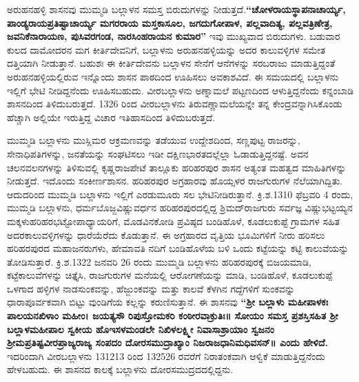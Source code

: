ಅರುಹನಹಳ್ಳಿ ಶಾಸನವು ಮುಮ್ಮಡಿ ಬಲ್ಲಾಳನ ಸಮಸ್ತ ಬಿರುದುಗಳನ್ನು ನೀಡುತ್ತದೆ.\textbf{“ಚೋಳರಾಯಸ್ಥಾಪನಾ\-ಚಾರ್ಯ್ಯ, ಪಾಂಡ್ಯರಾಯಪ್ರತಿಷ್ಟಾಚಾರ್ಯ್ಯ ಮಗರರಾಯ ಮಸ್ತಕಾಸೂಲ, ಜಗದುಗೋಪಾಳ, ಪಲ್ಲವಾದಿತ್ಯ, ಪಲ್ಲವತ್ರಿಣೇತ್ರ,\general{\break } ಜವನಿಕೆನಾರಾಯಣ, ಪುಸಿವರಗಂಡ, ನಾರಸಿಂಹರಾಯನ ಕುಮಾರ”} ಇವು ಮುಖ್ಯವಾದ ಬಿರುದುಗಳು. ಬಡುವಾರ ಕುಲದ ದಾಮೋದರನ ಮಗ ಕೀರ್ತಿದೇವನಿಗೆ, ಬಲ್ಲಾಳನು ಅರುಹನಹಳ್ಳಿಯನ್ನು ಅದರ ಕಾಲುವಳ್ಳಿಗಳ ಸಮೇತ ದತ್ತಿಯಾಗಿ ನೀಡುತ್ತಾನೆ. ಬಹುಶಃ ಈ ಕೀರ್ತಿದೇವನು ಬಲ್ಲಾಳನ ಸೇನೆಗೆ ಆನೆಗಳನ್ನು ಸರಬರಾಜು ಮಾಡುತ್ತಿದ್ದಂತೆ ಅರುಹನಹಳ್ಳಿಯಲ್ಲಿರುವ ಇನ್ನೊಂದು ಶಾಸನ ಪಾಠದಿಂದ ಊಹಿಸಲು ಅವಕಾಶವಿದೆ. ಈ ಸಮಯದಲ್ಲಿ ಬಲ್ಲಾಳನು ಇಲ್ಲಿಗೆ ಭೇಟಿ ನೀಡಿದ್ದನೆಂದು ಊಹಿಸಬಹುದು. ವೀರಬಲ್ಲಾಳನು ಅಣ್ನಾಮಲೆ ಪಟ್ಟಣದಿಂದ ಆಳುತ್ತಿದ್ದನೆಂದು ಕನ್ನಂಬಾಡಿ ಶಾಸನದಿಂದ ತಿಳಿದುಬರುತ್ತದೆ. 1326 ರಿಂದ ವೀರಬಲ್ಲಾಳನು ತಿರುವಣ್ಣಾಮಲೆಯನ್ನೇ ತನ್ನ ಕೇಂದ್ರವನ್ನಾಗಿಸಿಕೊಂಡು ಹೆಚ್ಚಾಗಿ ಅಲ್ಲಿಯೇ ಇರುತ್ತಿದ್ದ ವಿಚಾರ ಇತಿಹಾಸದಿಂದ ತಿಳಿದುಬರುತ್ತದೆ.

ಮುಮ್ಮಡಿ ಬಲ್ಲಾಳನು ಮುಸ್ಲಿಮರ ಆಕ್ರಮಣವನ್ನು ತಡೆಯುವ ಉದ್ದೇಶದಿಂದ, ಸಣ್ಣಪುಟ್ಟ ರಾಜರನ್ನು, ಸೇನಾಧಿಪತಿ\-ಗಳನ್ನು, ಜನತೆಯನ್ನು ಸಂಘಟಿಸಲು ಇಡೀ ದಕ್ಷಿಣಭಾರತದಲ್ಲೆಲ್ಲಾ ಓಡಾಡುತ್ತಿದ್ದನಷ್ಟೆ. ಅವನ ಚಲನವಲನಗಳನ್ನು ತಿಳಿಸುವಲ್ಲಿ ಕೃಷ್ಣರಾಜಪೇಟೆ ತಾಲ್ಲೂಕು ಹರಿಹರಪುರ ಶಾಸನ ಅತ್ಯಂತ ಮಹತ್ವದ ಮಾಹಿತಿಗಳನ್ನು ನೀಡುತ್ತದೆ. ಇದೊಂದು ಸಂಕೀರ್ಣ\-ಶಾಸನ. ಹರಿಹರಪುರ ಅಗ್ರಹಾರವು ಹೊಯ್ಸಳರ ರಾಜಗುರುಗಳ ನೆಲೆಯಾಗಿದ್ದಿತು. ಆದುದರಿಂದ ಮುಮ್ಮಡಿ ಬಲ್ಲಾಳನು ಇಲ್ಲಿಗೆ ಎರಡುಮೂರು ಸಲ ಭೇಟಿನೀಡಿರುತ್ತಾನೆ. ಕ್ರಿ.ಶ.1310 ಫೆಬ್ರವರಿ 4 ರಂದು, ಮುಮ್ಮಡಿ ಬಲ್ಲಾಳನು, ಧರ್ಮಬೊಜ್ಜವಿಷ್ಣುವರ್ಧನ ಹರಿಹರಪುರದಲ್ಲಿದ್ದ ಶ್ರಿಮದ್​ರಾಜಗುರು ಸರ್ವಜ್ಞ ವಿಷ್ಣುಭಟ್ಟಯ್ಯನ ಮಕ್ಕಳು\break ಹರಿಹರಭಟ್ಟೋಪಾಧ್ಯಾಯರಿಗೆ, ಮೊಡವಿನಕೋಡಿ ಪ್ರವಿಷ್ಠದ ಬಂಡಿಹೊಳೆ, ಕೂಡಲುಕುಪ್ಟೆ ಗ್ರಾಮಗಳ ಸಹಿತ ಅದರ\break ಕಾಲುವಳ್ಳಿಗಳನ್ನು ಧಾರೆಯೆರೆದು ಕೊಡುತ್ತಾನೆ. ಈ ಅಗ್ರಹಾರದ ವೃತ್ತಿಯ ಭೂಮಿಗಳಿಗೆ ನೀರು ಹರಿಸಲು ಹರಿಹರಪುರದ ಮಹಾಜನರುಗಳು, ಹೇಮಾವತಿ ನದಿಗೆ ಬಂಡಿಹೊಳೆಯ ಬಳಿ ಒಂದು ಕಟ್ಟೆಯನ್ನು ಕಟ್ಟಿ ಕಾಲುವೆಯನ್ನು ತೋಡಿಸುತ್ತಾರೆ. ಕ್ರಿ.ಶ.1322 ಜನವರಿ 26 ರಂದು ಮುಮ್ಮಡಿ ಬಲ್ಲಾಳನು ಹರಿಹರಪುರಕ್ಕೆ ಬಿಜಯಮಾಡಿ, ಕಟ್ಟೆಕಾಲುವೆಗಳನ್ನು ಚಿತ್ತೈಸಿ, ರಾಜಗುರುಗಳ ಮನೆಯಲ್ಲಿ ಆರೋಗಣೆಯನ್ನು ಮಾಡಿ, ಬಂಡಿಹೊಳೆ, ಕೂಡಲುಕುಪ್ಪೆ ಒಳಗಾದ ಹಳ್ಳಿಗಳ ನಾಡಸುಂಕವನ್ನು, ಹೆಜ್ಜುಂಕವನ್ನು ಮತ್ತು ಕಾಲವೆ ಕೆಳಗಿನ ಗದ್ದೆಗಳಿಗೆ ಸುಂಕವನ್ನು ಧಾರಾಪೂರ್ವಕವಾಗಿ ಬಿಟ್ಟು ವುಂಡಿಗೆಯ ಕಲ್ಲನ್ನು ಕರುಣಿಸು\-ತ್ತಾನೆ. ಈ ಶಾಸನವು \textbf{“ಶ‍್ರೀ ಬಲ್ಲಾಳು ಮಹೀಪಾಳಕಃ ಪಾಲಯನಖಿಳಾಂ ಮಹೀಂ। ಜಯತ್ಯಸೌ ರಿಪುಸ್ತೋಮಕರಿ ಕಂಠೀರವಾಕ್ರುತಿಃ॥ ಸೋಯಂ ಸಮಸ್ತ ಪ್ರಶಸ್ತಿಸಹಿತ ಶ‍್ರೀ ಬಲ್ಲಾಳಮಹೀಪಾಲ ಸ್ವಕೀಯ ಹೊಇಸಳಮಂಡಲೇ ನಿಖಿಳಲಕ್ಷ್ಮೀ ನಿವಾಸಾಶ್ರಾಯಾಂ ಸ್ವಜನಂ ಶ‍್ರೀಮಪ್ರತಿಷ್ಟವೀರಪ್ರಾಜ್ಯರಾಜ್ಯ ಸಂಪದಂ ದೋರಸಮುದ್ರಾಖ್ಯಾಂ ನಿಜರಾಜಧಾನಿಮಧಿವಸನ್​॥ ಎಂದು ಹೇಳಿದೆ. } ಇದರಿಂದಾಗಿ ವೀರಬಲ್ಲಾಳನು 1312\enginline{-}13 ರಿಂದ 1325\enginline{-}26 ರವರೆಗೆ ನಿರಾತಂಕವಾಗಿ ಆಳ್ವಿಕೆ ಮಾಡುತ್ತಿದ್ದನೆಂದು ಹೇಳಬಹುದು. ಈ ಶಾಸನದ ಕಾಲಕ್ಕೆ ಬಲ್ಲಾಳನು ದೋರಸಮುದ್ರದದಲ್ಲಿದ್ದನು.

